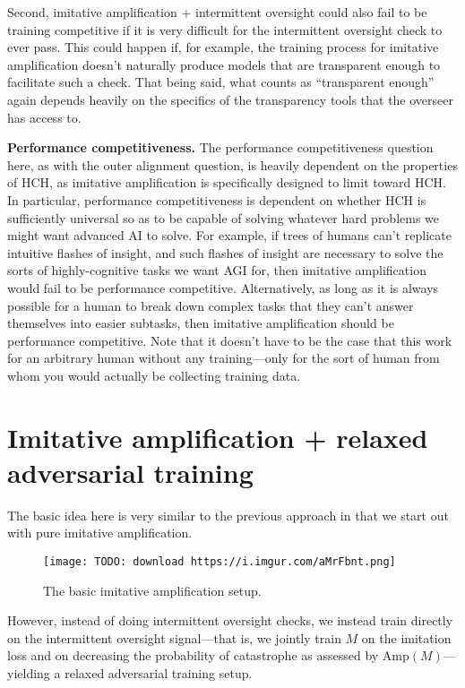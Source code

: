 \documentclass[
  onecolumn,
  natbib,
]{miri-tech-article}
\begin{document}
Second, imitative amplification + intermittent oversight could also fail to be training competitive if it is very difficult for the intermittent oversight check to ever pass. This could happen if, for example, the training process for imitative amplification doesn't naturally produce models that are transparent enough to facilitate such a check. That being said, what counts as ``transparent enough'' again depends heavily on the specifics of the transparency tools that the overseer has access to.

\textbf{Performance competitiveness.} The performance competitiveness question here, as with the outer alignment question, is heavily dependent on the properties of HCH, as imitative amplification is specifically designed to limit toward HCH. In particular, performance competitiveness is dependent on whether HCH is sufficiently universal so as to be capable of solving whatever hard problems we might want advanced AI to solve. For example, if trees of humans can't replicate intuitive flashes of insight, and such flashes of insight are necessary to solve the sorts of highly-cognitive tasks we want AGI for, then imitative amplification would fail to be performance competitive. Alternatively, as long as it is always possible for a human to break down complex tasks that they can't answer themselves into easier subtasks, then imitative amplification should be performance competitive. Note that it doesn't have to be the case that this work for an arbitrary human without any training---only for the sort of human from whom you would actually be collecting training data.

\section{Imitative amplification + relaxed adversarial training}
\label{sec:3}

The basic idea here is very similar to the previous approach in that we start out with pure imitative amplification.

\begin{figure}[h!]
  \centering
  \texttt{[image: TODO: download https://i.imgur.com/aMrFbnt.png]}
  \caption{The basic imitative amplification setup.}
\end{figure}

However, instead of doing intermittent oversight checks, we instead train directly on the intermittent oversight signal---that is, we jointly train $M$ on the imitation loss and on decreasing the probability of catastrophe as assessed by $\text{Amp}(M)$---yielding a relaxed adversarial training setup\cite{TODO: cite https://www.alignmentforum.org/posts/9Dy5YRaoCxH9zuJqa/relaxed-adversarial-training-for-inner-alignment}.
\end{document}
